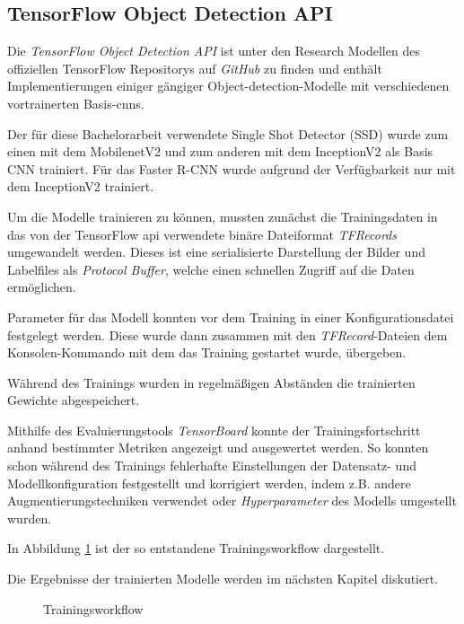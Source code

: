 \subsection{TensorFlow Object Detection API}

Die \textit{TensorFlow Object Detection API} ist unter den
Research Modellen des offiziellen TensorFlow
Repositorys auf \textit{GitHub} zu finden \cite{tfobjdet}
und enthält Implementierungen
einiger gängiger Object-detection-Modelle mit verschiedenen 
vortrainerten Basis-\Glspl{cnn}.

Der für diese Bachelorarbeit verwendete Single 
Shot Detector (SSD) wurde zum einen mit dem 
MobilenetV2 und zum anderen mit dem 
InceptionV2 als Basis CNN trainiert.
Für das Faster R-CNN wurde aufgrund 
der Verfügbarkeit nur mit dem InceptionV2
trainiert.

Um die Modelle trainieren zu können, mussten zunächst die 
Trainingsdaten in das von der TensorFlow \Gls{api}
verwendete binäre Dateiformat \textit{TFRecords} 
umgewandelt werden.
Dieses ist eine serialisierte Darstellung der Bilder
 und Labelfiles als \textit{Protocol Buffer},
welche einen schnellen Zugriff auf die Daten ermöglichen.

Parameter für das Modell konnten vor dem Training 
in einer Konfigurationsdatei festgelegt werden.
Diese wurde dann zusammen mit den \textit{TFRecord}-Dateien 
dem Konsolen-Kommando mit dem das Training 
gestartet wurde, übergeben.

Während des Trainings wurden in regelmäßigen 
Abständen die trainierten Gewichte abgespeichert.

Mithilfe des Evaluierungstools \textit{TensorBoard}
konnte der Trainingsfortschritt anhand bestimmter
Metriken angezeigt und ausgewertet werden. So konnten schon während des Trainings fehlerhafte
Einstellungen der Datensatz- und 
Modellkonfiguration festgestellt 
und korrigiert werden, indem z.B. andere
Augmentierungstechniken verwendet
oder \textit{Hyperparameter} des
Modells umgestellt wurden.

In Abbildung \ref{fig:train_workflow}
ist der so entstandene Trainingsworkflow dargestellt.

Die Ergebnisse der trainierten Modelle 
werden im nächsten Kapitel diskutiert.
\vspace{1cm}

\begin{figure}[H]
    \centering
    
    \caption{Trainingsworkflow}
    \label{fig:train_workflow}
\end{figure}
\vspace{1cm}


